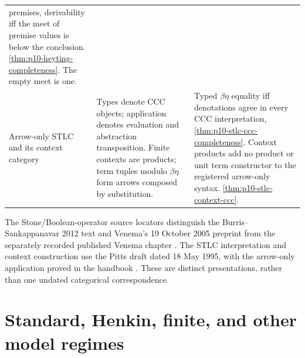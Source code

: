 \begin{longtable}{@{}p{}p{}p{}@{}}
premises, derivability iff the meet of premise values is below the
conclusion. \cref{thm:p10-heyting-completeness}. The empty meet is one. \\
Arrow-only STLC and its context category &
Types denote CCC objects; application denotes evaluation and abstraction
transposition. Finite contexts are products; term tuples modulo
\(\beta\eta\) form arrows composed by substitution. &
Typed \(\beta\eta\) equality iff denotations agree in every CCC
interpretation, \cref{thm:p10-stlc-ccc-completeness}. Context products add
no product or unit term constructor to the registered arrow-only syntax.
\cref{thm:p10-stlc-context-ccc}. \\
\bottomrule
\end{longtable}

The Stone/Boolean-operator source locators distinguish the
Burris--Sankappanavar 2012 text and Venema's 19 October 2005 preprint from
the separately recorded published Venema chapter
\cite{BurrisSankappanavar2012,Venema2005Preprint,Venema2007}.
The STLC interpretation and context construction use the Pitts draft dated
18 May 1995, with the arrow-only application proved in the handbook
\cite{Pitts1995Draft}. These are distinct presentations, rather than
one undated categorical correspondence.

\section{Standard, Henkin, finite, and other model regimes}
\label{sec:p14-translation-model-regimes}


